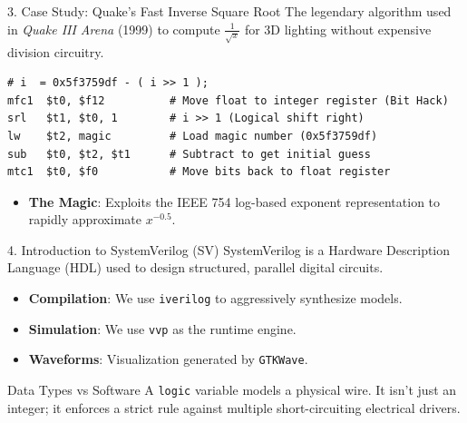 \documentclass[aspectratio=169]{beamer}
\begin{document}
\begin{frame}[fragile]{3. Case Study: Quake's Fast Inverse Square Root}
The legendary algorithm used in \textit{Quake III Arena} (1999) to compute $\frac{1}{\sqrt{x}}$ for 3D lighting without expensive division circuitry.
\vspace{0.1cm}
\begin{verbatim}
# i  = 0x5f3759df - ( i >> 1 );
mfc1  $t0, $f12          # Move float to integer register (Bit Hack)
srl   $t1, $t0, 1        # i >> 1 (Logical shift right)
lw    $t2, magic         # Load magic number (0x5f3759df)
sub   $t0, $t2, $t1      # Subtract to get initial guess
mtc1  $t0, $f0           # Move bits back to float register
\end{verbatim}
\vspace{0.1cm}
\begin{itemize}
    \item \textbf{The Magic}: Exploits the IEEE 754 log-based exponent representation to rapidly approximate $x^{-0.5}$.
\end{itemize}
\end{frame}

\begin{frame}{4. Introduction to SystemVerilog (SV)}
SystemVerilog is a Hardware Description Language (HDL) used to design structured, parallel digital circuits.
\vspace{0.3cm}
\begin{itemize}
    \item \textbf{Compilation}: We use \texttt{iverilog} to aggressively synthesize models.
    \item \textbf{Simulation}: We use \texttt{vvp} as the runtime engine.
    \item \textbf{Waveforms}: Visualization generated by \texttt{GTKWave}.
\end{itemize}
\begin{block}{Data Types vs Software}
A \texttt{logic} variable models a physical wire. It isn't just an integer; it enforces a strict rule against multiple short-circuiting electrical drivers.
\end{block}
\end{frame}
\end{document}
